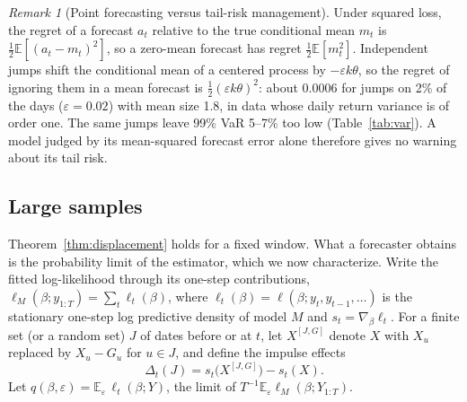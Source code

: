 \documentclass[11pt,a4paper]{article}
\theoremstyle{definition}
\theoremstyle{remark}
\newtheorem{remark}{Remark}
\newcommand{\E}{\mathbb{E}}
\begin{document}
\begin{remark}[Point forecasting versus tail-risk management]\label{rem:meantail}
Under squared loss, the regret of a forecast $a_t$ relative to the true conditional mean $m_t$ is $\tfrac12\E[(a_t-m_t)^2]$, so a zero-mean forecast has regret $\tfrac12\E[m_t^2]$. Independent jumps shift the conditional mean of a centered process by $-\varepsilon k\theta$, so the regret of ignoring them in a mean forecast is $\tfrac12(\varepsilon k\theta)^2$: about $0.0006$ for jumps on 2\% of the days ($\varepsilon=0.02$) with mean size 1.8, in data whose daily return variance is of order one. The same jumps leave 99\% VaR 5--7\% too low (Table~\ref{tab:var}). A model judged by its mean-squared forecast error alone therefore gives no warning about its tail risk.
\end{remark}

\subsection{Large samples}\label{sec:largeT}
Theorem~\ref{thm:displacement} holds for a fixed window. What a forecaster obtains is the probability limit of the estimator, which we now characterize. Write the fitted log-likelihood through its one-step contributions, $\ell_M(\beta;y_{1:T})=\sum_t\ell_t(\beta)$, where $\ell_t(\beta)=\ell(\beta;y_t,y_{t-1},\dots)$ is the stationary one-step log predictive density of model $M$ and $s_t=\nabla_\beta\ell_t$. For a finite set (or a random set) $J$ of dates before or at $t$, let $X^{[J,G]}$ denote $X$ with $X_u$ replaced by $X_u-G_u$ for $u\in J$, and define the impulse effects
\[
\Delta_t(J)=s_t\big(X^{[J,G]}\big)-s_t(X).
\]
Let $q(\beta,\varepsilon)=\E_\varepsilon\,\ell_t(\beta;Y)$, the limit of $T^{-1}\E_\varepsilon\ell_M(\beta;Y_{1:T})$.
\end{document}
